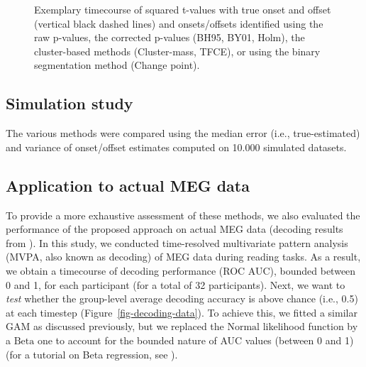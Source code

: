 \documentclass[
  doc,
  floatsintext,
  longtable,
  a4paper,
  nolmodern,
  notxfonts,
  notimes,
  colorlinks=true,linkcolor=blue,citecolor=blue,urlcolor=blue]{apa7}
\begin{document}
\begin{figure}[!htb]

\caption{\label{fig-corrections}Exemplary timecourse of squared t-values
with true onset and offset (vertical black dashed lines) and
onsets/offsets identified using the raw p-values, the corrected p-values
(BH95, BY01, Holm), the cluster-based methods (Cluster-mass, TFCE), or
using the binary segmentation method (Change point).}


\end{figure}%

\newpage

\subsection{Simulation study}\label{simulation-study}

The various methods were compared using the median error (i.e.,
true-estimated) and variance of onset/offset estimates computed on
10.000 simulated datasets.

\subsection{Application to actual MEG
data}\label{application-to-actual-meg-data}

To provide a more exhaustive assessment of these methods, we also
evaluated the performance of the proposed approach on actual MEG data
(decoding results from ). In this study, we conducted time-resolved
multivariate pattern analysis (MVPA, also known as decoding) of MEG data
during reading tasks. As a result, we obtain a timecourse of decoding
performance (ROC AUC), bounded between 0 and 1, for each participant
(for a total of 32 participants). Next, we want to \emph{test} whether
the group-level average decoding accuracy is above chance (i.e., 0.5) at
each timestep (Figure~\ref{fig-decoding-data}). To achieve this, we
fitted a similar GAM as discussed previously, but we replaced the
\(\mathrm{Normal}\) likelihood function by a \(\mathrm{Beta}\) one to
account for the bounded nature of AUC values (between 0 and 1) (for a
tutorial on Beta regression, see ).
\end{document}
